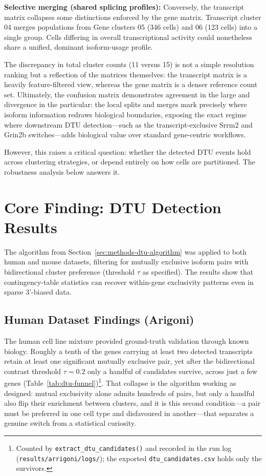 \textbf{Selective merging (shared splicing profiles):} Conversely, the transcript matrix collapses some distinctions enforced by the gene matrix. Transcript cluster 04 merges populations from Gene clusters 05 (346 cells) and 06 (123 cells) into a single group. Cells differing in overall transcriptional activity could nonetheless share a unified, dominant isoform-usage profile.

The discrepancy in total cluster counts (11 versus 15) is not a simple resolution ranking but a reflection of the matrices themselves: the transcript matrix is a heavily feature-filtered view, whereas the gene matrix is a denser reference count set. Ultimately, the confusion matrix demonstrates agreement in the large and divergence in the particular: the local splits and merges mark precisely where isoform information redraws biological boundaries, exposing the exact regime where downstream DTU detection---such as the transcript-exclusive Srrm2 and Grin2b switches---adds biological value over standard gene-centric workflows.

However, this raises a critical question: whether the detected DTU events hold across clustering strategies, or depend entirely on how cells are partitioned. The robustness analysis below answers it.

\section{Core Finding: DTU Detection Results}\label{sec:dtu-results}
The algorithm from Section~\ref{sec:methods-dtu-algorithm} was applied to both human and mouse datasets, filtering for mutually exclusive isoform pairs with bidirectional cluster preference (threshold $\tau$ as specified). The results show that contingency-table statistics can recover within-gene exclusivity patterns even in sparse 3'-biased data.

\subsection*{Human Dataset Findings (Arigoni)}\label{sec:results-human}

The human cell line mixture provided ground-truth validation through known biology. Roughly a tenth of the genes carrying at least two detected transcripts retain at least one significant mutually exclusive pair, yet after the bidirectional contrast threshold $\tau = 0.2$ only a handful of candidates survive, across just a few genes (Table~\ref{tab:dtu-funnel})\footnote{Counted by \texttt{extract\_dtu\_candidates()} and recorded in the run log (\texttt{results/arrigoni/logs/}); the exported \texttt{dtu\_candidates.csv} holds only the survivors.}. That collapse is the algorithm working as designed: mutual exclusivity alone admits hundreds of pairs, but only a handful also flip their enrichment between clusters, and it is this second condition---a pair must be preferred in one cell type and disfavoured in another---that separates a genuine switch from a statistical curiosity.

